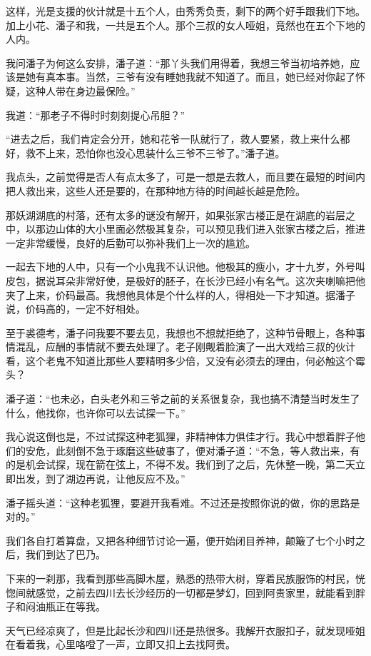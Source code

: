 这样，光是支援的伙计就是十五个人，由秀秀负责，剩下的两个好手跟我们下地。加上小花、潘子和我，一共是五个人。那个三叔的女人哑姐，竟然也在五个下地的人内。

我问潘子为何这么安排，潘子道：“那丫头我们用得着，我想三爷当初培养她，应该是她有真本事。当然，三爷有没有睡她我就不知道了。而且，她已经对你起了怀疑，这种人带在身边最保险。”

我道：“那老子不得时时刻刻提心吊胆？”

“进去之后，我们肯定会分开，她和花爷一队就行了，救人要紧，救上来什么都好，救不上来，恐怕你也没心思装什么三爷不三爷了。”潘子道。

我点头，之前觉得是否人有点太多了，可是一想是去救人，而且要在最短的时间内把人救出来，这些人还是要的，在那种地方待的时间越长越是危险。

那妖湖湖底的村落，还有太多的谜没有解开，如果张家古楼正是在湖底的岩层之中，以那边山体的大小里面必然极其复杂，可以预见我们进入张家古楼之后，推进一定非常缓慢，良好的后勤可以弥补我们上一次的尴尬。

一起去下地的人中，只有一个小鬼我不认识他。他极其的瘦小，才十九岁，外号叫皮包，据说耳朵非常好使，是极好的胚子，在长沙已经小有名气。这次夹喇嘛把他夹了上来，价码最高。我想他具体是个什么样的人，得相处一下才知道。据潘子说，价码高的，一定不好相处。

至于裘德考，潘子问我要不要去见，我想也不想就拒绝了，这种节骨眼上，各种事情混乱，应酬的事情就不要去处理了。老子刚觍着脸演了一出大戏给三叔的伙计看，这个老鬼不知道比那些人要精明多少倍，又没有必须去的理由，何必触这个霉头？

潘子道：“也未必，白头老外和三爷之前的关系很复杂，我也搞不清楚当时发生了什么，他找你，也许你可以去试探一下。”

我心说这倒也是，不过试探这种老狐狸，非精神体力俱佳才行。我心中想着胖子他们的安危，此刻倒不急于琢磨这些破事了，便对潘子道：“不急，等人救出来，有的是机会试探，现在箭在弦上，不得不发。我们到了之后，先休整一晚，第二天立即出发，到了湖边再说，让他反应不及。”

潘子摇头道：“这种老狐狸，要避开我看难。不过还是按照你说的做，你的思路是对的。”

我们各自打着算盘，又把各种细节讨论一遍，便开始闭目养神，颠簸了七个小时之后，我们到达了巴乃。

下来的一刹那，我看到那些高脚木屋，熟悉的热带大树，穿着民族服饰的村民，恍惚间就感觉，之前去四川去长沙经历的一切都是梦幻，回到阿贵家里，就能看到胖子和闷油瓶正在等我。

天气已经凉爽了，但是比起长沙和四川还是热很多。我解开衣服扣子，就发现哑姐在看着我，心里咯噔了一声，立即又扣上去找阿贵。

